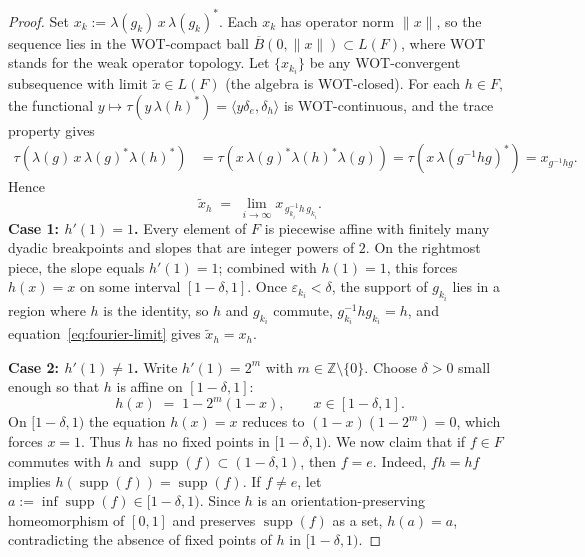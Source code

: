\documentclass[10pt,a4paper]{amsart}
\newcommand{\supp}{\operatorname{supp}}
\begin{document}
\begin{proof}
Set $x_k := \lambda(g_k)\, x\, \lambda(g_k)^*$. Each $x_k$ has operator norm $\|x\|$, so the sequence lies in the WOT-compact ball $\overline{B}(0, \|x\|) \subset L(F)$, where WOT stands for the weak operator topology.  Let $\{x_{k_i}\}$ be any WOT-convergent subsequence with limit $\tilde{x} \in L(F)$ (the algebra is WOT-closed). For each $h \in F$, the functional $y \mapsto \tau(y\,\lambda(h)^*) = \langle y\delta_e, \delta_h\rangle$ is WOT-continuous, and the trace property gives
\begin{align*}
\tau\!\left(\lambda(g)\, x\, \lambda(g)^* \lambda(h)^*\right) &= \tau\!\left(x\, \lambda(g)^* \lambda(h)^* \lambda(g)\right) = \tau\!\left(x\, \lambda(g^{-1} h g)^*\right) =x_{g^{-1} h g}.
\end{align*}
Hence
\begin{equation}\label{eq:fourier-limit}
\tilde{x}_h \;=\; \lim_{i \to \infty} x_{\, g_{k_i}^{-1} h\, g_{k_i}}.
\end{equation}
\medskip
\noindent\textbf{Case 1: $h'(1) = 1$.} Every element of $F$ is piecewise affine with finitely many dyadic breakpoints and slopes that are integer powers of $2$. On the rightmost piece, the slope equals $h'(1) = 1$; combined with $h(1) = 1$, this forces $h(x) = x$ on some interval $[1 - \delta, 1]$. Once $\varepsilon_{k_i} < \delta$, the support of $g_{k_i}$ lies in a region where $h$ is the identity, so $h$ and $g_{k_i}$ commute, $g_{k_i}^{-1} h g_{k_i} = h$, and equation~\eqref{eq:fourier-limit} gives $\tilde{x}_h = x_h$.

\medskip
\noindent\textbf{Case 2: $h'(1) \neq 1$.} Write $h'(1) = 2^m$ with $m \in \mathbb{Z} \setminus \{0\}$. Choose $\delta > 0$ small enough so that $h$ is affine on $[1 - \delta, 1]$:
\[
h(x) \;=\; 1 - 2^m(1 - x), \qquad x \in [1 - \delta, 1].
\]
On $[1 - \delta, 1)$ the equation $h(x) = x$ reduces to $(1 - x)(1 - 2^m) = 0$, which forces $x = 1$. Thus $h$ has no fixed points in $[1 - \delta, 1)$.
We now claim that if $f \in F$ commutes with $h$ and $\supp(f) \subset (1 - \delta, 1)$, then $f = e$.
Indeed, $fh = hf$ implies $h(\supp(f)) = \supp(f)$. If $f \neq e$, let $a := \inf \supp(f) \in [1 - \delta, 1)$. Since $h$ is an orientation-preserving homeomorphism of $[0,1]$ and preserves $\supp(f)$ as a set, $h(a) = a$, contradicting the absence of fixed points of $h$ in $[1 - \delta, 1)$.


\end{proof}
\end{document}
